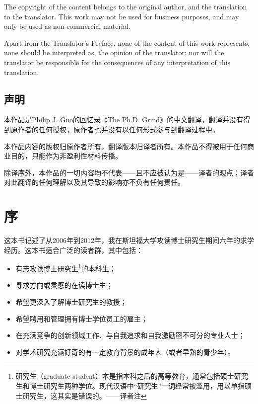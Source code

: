 \documentclass[12pt,UTF8,nofonts]{book}
\begin{document}
The copyright of the content belongs to the original author, and the translation to the translator. This work may not be used for business purposes, and may only be used as non-commercial material.

Apart from the Translator's Preface, none of the content of this work represents, none should be interpreted as, the opinion of the translator; nor will the translator be responsible for the consequences of any interpretation of this translation.

\section*{声明}

本作品是Philip J. Guo的回忆录《The Ph.D. Grind》的中文翻译，翻译并没有得到原作者的任何授权，原作者也并没有以任何形式参与到翻译过程中。

本作品内容的版权归原作者所有，翻译版本归译者所有。本作品不得被用于任何商业目的，只能作为非盈利性材料传播。

除译序外，本作品的一切内容均不代表——且不应被认为是——译者的观点；译者对此翻译的任何理解以及其导致的影响亦不负有任何责任。


\mainmatter

\chapter*{序}
\markboth{}{}

这本书记述了从2006年到2012年，我在斯坦福大学攻读博士研究生期间六年的求学经历。这本书适合广泛的读者群，其中包括：

\begin{itemize}
\item 有志攻读博士研究生\footnote{研究生（graduate student）本是指本科之后的高等教育，通常包括硕士研究生和博士研究生两种学位。现代汉语中“研究生”一词经常被滥用，用以单指硕士研究生，这其实是错误的。——译者注}的本科生；
\item 寻求方向或灵感的在读博士生；
\item 希望更深入了解博士研究生的教授；
\item 希望聘用和管理拥有博士学位员工的雇主；
\item 在充满竞争的创新领域工作、与自我追求和自我激励密不可分的专业人士；
\item 对学术研究充满好奇的有一定教育背景的成年人（或者早熟的青少年）。
\end{itemize}
\end{document}
